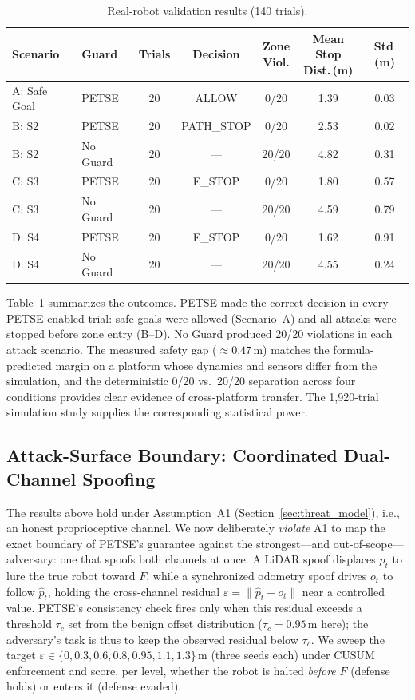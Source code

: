 \documentclass[conference]{IEEEtran}
\newcommand{\tblstyle}{\small\setlength{\tabcolsep}{4pt}}
\begin{document}
\begin{table}[t]
\centering
\tblstyle
\caption{Real-robot validation results (140 trials).}
\label{tab:real}
\footnotesize
\begin{tabular}{@{}l l ccccc@{}}
\toprule
Scenario & Guard & Trials & Decision & \makecell{Zone\\Viol.} & \makecell{Mean Stop\\Dist.\,(m)} & Std\,(m) \\
\midrule
A: Safe Goal & PETSE & 20 & ALLOW & 0/20 & 1.39 & 0.03 \\
B: S2 & PETSE & 20 & PATH\_STOP & 0/20 & 2.53 & 0.02 \\
B: S2 & No Guard & 20 & --- & 20/20 & 4.82 & 0.31 \\
\midrule
C: S3 & PETSE & 20 & E\_STOP & 0/20 & 1.80 & 0.57 \\
C: S3 & No Guard & 20 & --- & 20/20 & 4.59 & 0.79 \\
D: S4 & PETSE & 20 & E\_STOP & 0/20 & 1.62 & 0.91 \\
D: S4 & No Guard & 20 & --- & 20/20 & 4.55 & 0.24 \\
\bottomrule
\end{tabular}
\end{table}

Table~\ref{tab:real} summarizes the outcomes. PETSE made the correct decision in every PETSE-enabled trial: safe goals were allowed (Scenario~A) and all attacks were stopped before zone entry (B--D). No Guard produced 20/20 violations in each attack scenario. The measured safety gap (${\approx}0.47$\,m) matches the formula-predicted margin on a platform whose dynamics and sensors differ from the simulation, and the deterministic 0/20 vs.\ 20/20 separation across four conditions provides clear evidence of cross-platform transfer. The 1{,}920-trial simulation study supplies the corresponding statistical power.

\subsection{Attack-Surface Boundary: Coordinated Dual-Channel Spoofing}\label{sec:coord}
The results above hold under Assumption~A1 (Section~\ref{sec:threat_model}), i.e., an
honest proprioceptive channel. We now deliberately \emph{violate} A1 to map the exact
boundary of PETSE's guarantee against the strongest---and out-of-scope---adversary: one
that spoofs both channels at once. A LiDAR spoof displaces $\hat{p}_t$ to lure the true
robot toward $F$, while a synchronized odometry spoof drives $o_t$ to follow $\hat{p}_t$,
holding the cross-channel residual $\varepsilon=\lVert \hat{p}_t-o_t\rVert$ near a
controlled value. PETSE's consistency check fires only when this residual exceeds a
threshold $\tau_c$ set from the benign offset distribution ($\tau_c{=}0.95$\,m here); the
adversary's task is thus to keep the observed residual below $\tau_c$. We sweep the target
$\varepsilon\in\{0,0.3,0.6,0.8,0.95,1.1,1.3\}$\,m (three seeds each) under CUSUM enforcement
and score, per level, whether the robot is halted \emph{before} $F$ (defense holds) or
enters it (defense evaded).
\end{document}
